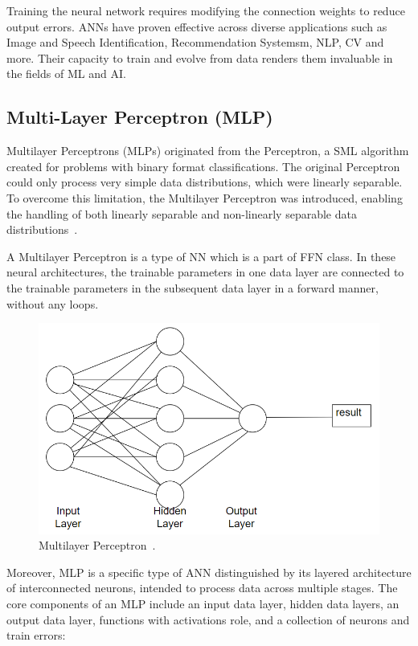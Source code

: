 \documentclass[12pt,a4paper]{report}
\begin{document}
Training the neural network requires modifying the connection weights to reduce output errors. ANNs have proven effective across diverse applications such as Image and Speech Identification, Recommendation Systemsm, NLP, CV and more. Their capacity to train and evolve from data renders them invaluable in the fields of ML and AI.

\subsection{Multi-Layer Perceptron (MLP)}
Multilayer Perceptrons (MLPs) originated from the Perceptron, a SML algorithm created for problems with binary format classifications. The original Perceptron could only process very simple data distributions, which were linearly separable. To overcome this limitation, the Multilayer Perceptron was introduced, enabling the handling of both linearly separable and non-linearly separable data distributions~\cite{mlp}.

A Multilayer Perceptron is a type of NN which is a part of FFN class. In these neural architectures, the trainable parameters in one data layer are connected to the trainable parameters in the subsequent data layer in a forward manner, without any loops.

\begin{figure}[th]
  \centering
  \includegraphics[scale=0.65]{./pics/mlp.png}
  \caption[Multilayer Perceptron]{Multilayer Perceptron~\cite{mlp}.}
  \label{fig:pi5}
\end{figure}

Moreover, MLP is a specific type of ANN distinguished by its layered architecture of interconnected neurons, intended to process data across multiple stages. The core components of an MLP include an input data layer, hidden data layers, an output data layer, functions with activations role, and a collection of neurons and train errors:
\end{document}
